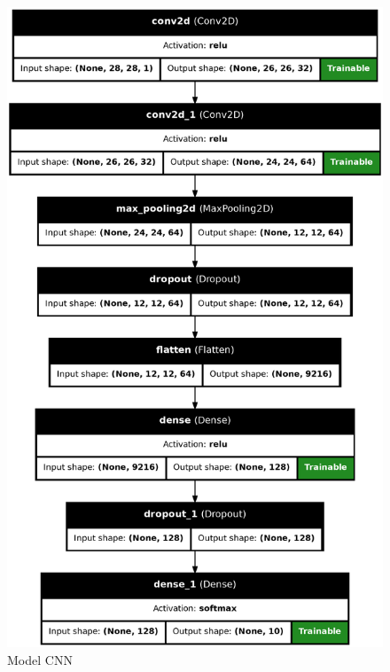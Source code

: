\documentclass[12pt]{article}
\begin{document}
\begin{figure}[H]
  \centering
  \begin{minipage}{0.4\textwidth}
    \centering
    \includegraphics[width=\textwidth]{../images/models/model_cnn_graph.png}
    \caption{Model CNN}
    \label{fig:model_cnn_graph}
  \end{minipage}%
  \hfill
  \begin{minipage}{0.4\textwidth}
    \centering

\end{minipage}
\end{figure}
\end{document}
